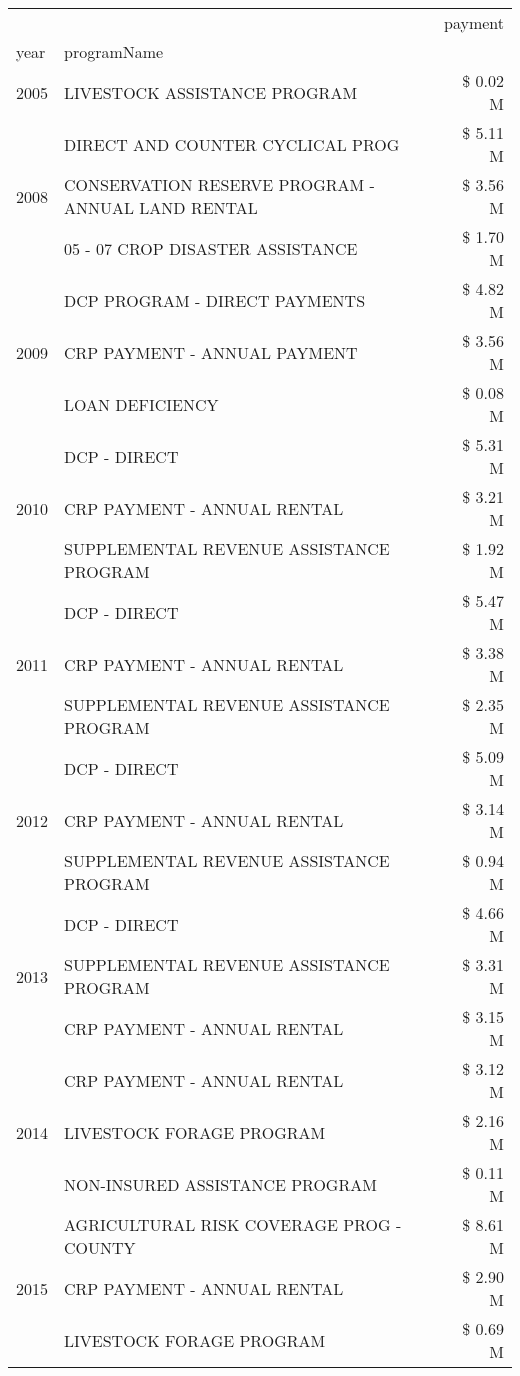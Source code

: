 \begin{tabular}{llr}
\toprule
 &  & payment \\
year & programName &  \\
\midrule
2005 & LIVESTOCK ASSISTANCE PROGRAM & \$ 0.02 M \\
\cline{1-3}
\multirow[t]{3}{*}{2008} & DIRECT AND COUNTER CYCLICAL PROG & \$ 5.11 M \\
 & CONSERVATION RESERVE PROGRAM - ANNUAL LAND RENTAL & \$ 3.56 M \\
 & 05 - 07 CROP DISASTER ASSISTANCE & \$ 1.70 M \\
\cline{1-3}
\multirow[t]{3}{*}{2009} & DCP PROGRAM - DIRECT PAYMENTS & \$ 4.82 M \\
 & CRP PAYMENT - ANNUAL PAYMENT & \$ 3.56 M \\
 & LOAN DEFICIENCY & \$ 0.08 M \\
\cline{1-3}
\multirow[t]{3}{*}{2010} & DCP - DIRECT & \$ 5.31 M \\
 & CRP PAYMENT - ANNUAL RENTAL & \$ 3.21 M \\
 & SUPPLEMENTAL REVENUE ASSISTANCE PROGRAM & \$ 1.92 M \\
\cline{1-3}
\multirow[t]{3}{*}{2011} & DCP - DIRECT & \$ 5.47 M \\
 & CRP PAYMENT - ANNUAL RENTAL & \$ 3.38 M \\
 & SUPPLEMENTAL REVENUE ASSISTANCE PROGRAM & \$ 2.35 M \\
\cline{1-3}
\multirow[t]{3}{*}{2012} & DCP - DIRECT & \$ 5.09 M \\
 & CRP PAYMENT - ANNUAL RENTAL & \$ 3.14 M \\
 & SUPPLEMENTAL REVENUE ASSISTANCE PROGRAM & \$ 0.94 M \\
\cline{1-3}
\multirow[t]{3}{*}{2013} & DCP - DIRECT & \$ 4.66 M \\
 & SUPPLEMENTAL REVENUE ASSISTANCE PROGRAM & \$ 3.31 M \\
 & CRP PAYMENT - ANNUAL RENTAL & \$ 3.15 M \\
\cline{1-3}
\multirow[t]{3}{*}{2014} & CRP PAYMENT - ANNUAL RENTAL & \$ 3.12 M \\
 & LIVESTOCK FORAGE PROGRAM & \$ 2.16 M \\
 & NON-INSURED ASSISTANCE PROGRAM & \$ 0.11 M \\
\cline{1-3}
\multirow[t]{3}{*}{2015} & AGRICULTURAL RISK COVERAGE PROG - COUNTY & \$ 8.61 M \\
 & CRP PAYMENT - ANNUAL RENTAL & \$ 2.90 M \\
 & LIVESTOCK FORAGE PROGRAM & \$ 0.69 M \\

\end{tabular}
